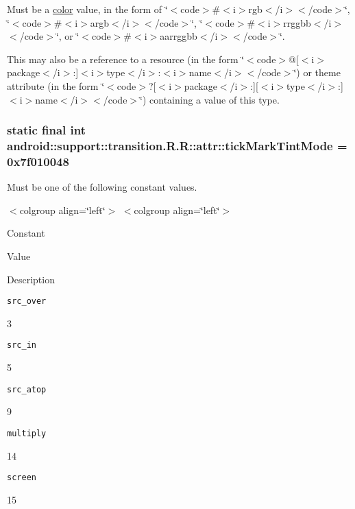 Must be a \hyperlink{classandroid_1_1support_1_1transition_1_1_r_1_1color}{color} value, in the form of \char`\"{}$<$code$>$\#$<$i$>$rgb$<$/i$>$$<$/code$>$\char`\"{}, \char`\"{}$<$code$>$\#$<$i$>$argb$<$/i$>$$<$/code$>$\char`\"{}, \char`\"{}$<$code$>$\#$<$i$>$rrggbb$<$/i$>$$<$/code$>$\char`\"{}, or \char`\"{}$<$code$>$\#$<$i$>$aarrggbb$<$/i$>$$<$/code$>$\char`\"{}. 

This may also be a reference to a resource (in the form \char`\"{}$<$code$>$@\mbox{[}$<$i$>$package$<$/i$>$:\mbox{]}$<$i$>$type$<$/i$>$:$<$i$>$name$<$/i$>$$<$/code$>$\char`\"{}) or theme attribute (in the form \char`\"{}$<$code$>$?\mbox{[}$<$i$>$package$<$/i$>$:\mbox{]}\mbox{[}$<$i$>$type$<$/i$>$:\mbox{]}$<$i$>$name$<$/i$>$$<$/code$>$\char`\"{}) containing a value of this type. \hypertarget{classandroid_1_1support_1_1transition_1_1_r_1_1attr_b9d1e4653b3f0b08910de7317b47d28f}{
\subsubsection[{tickMarkTintMode}]{\setlength{\rightskip}{0pt plus 5cm}static final int android::support::transition.R.R::attr::tickMarkTintMode = 0x7f010048}}
\label{classandroid_1_1support_1_1transition_1_1_r_1_1attr_b9d1e4653b3f0b08910de7317b47d28f}


Must be one of the following constant values. \begin{TabularC}{0}
\hline
\end{TabularC}
$<$colgroup align=\char`\"{}left\char`\"{}$>$ $<$colgroup align=\char`\"{}left\char`\"{}$>$ 

Constant

Value

Description 

{\tt src\_\-over}

3

{\tt src\_\-in}

5

{\tt src\_\-atop}

9

{\tt multiply}

14

{\tt screen}

15

